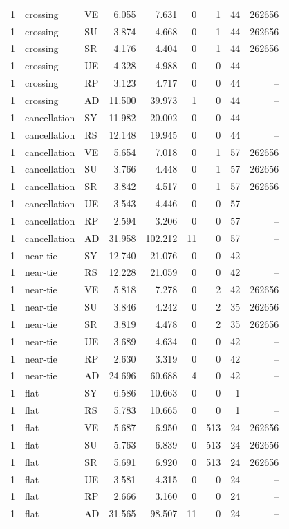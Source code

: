 \begin{longtable}{rllrrrrrr}
1 & crossing & VE & 6.055 & 7.631 & 0 & 1 & 44 & 262656 \\
1 & crossing & SU & 3.874 & 4.668 & 0 & 1 & 44 & 262656 \\
1 & crossing & SR & 4.176 & 4.404 & 0 & 1 & 44 & 262656 \\
1 & crossing & UE & 4.328 & 4.988 & 0 & 0 & 44 & -- \\
1 & crossing & RP & 3.123 & 4.717 & 0 & 0 & 44 & -- \\
1 & crossing & AD & 11.500 & 39.973 & 1 & 0 & 44 & -- \\
1 & cancellation & SY & 11.982 & 20.002 & 0 & 0 & 44 & -- \\
1 & cancellation & RS & 12.148 & 19.945 & 0 & 0 & 44 & -- \\
1 & cancellation & VE & 5.654 & 7.018 & 0 & 1 & 57 & 262656 \\
1 & cancellation & SU & 3.766 & 4.448 & 0 & 1 & 57 & 262656 \\
1 & cancellation & SR & 3.842 & 4.517 & 0 & 1 & 57 & 262656 \\
1 & cancellation & UE & 3.543 & 4.446 & 0 & 0 & 57 & -- \\
1 & cancellation & RP & 2.594 & 3.206 & 0 & 0 & 57 & -- \\
1 & cancellation & AD & 31.958 & 102.212 & 11 & 0 & 57 & -- \\
1 & near-tie & SY & 12.740 & 21.076 & 0 & 0 & 42 & -- \\
1 & near-tie & RS & 12.228 & 21.059 & 0 & 0 & 42 & -- \\
1 & near-tie & VE & 5.818 & 7.278 & 0 & 2 & 42 & 262656 \\
1 & near-tie & SU & 3.846 & 4.242 & 0 & 2 & 35 & 262656 \\
1 & near-tie & SR & 3.819 & 4.478 & 0 & 2 & 35 & 262656 \\
1 & near-tie & UE & 3.689 & 4.634 & 0 & 0 & 42 & -- \\
1 & near-tie & RP & 2.630 & 3.319 & 0 & 0 & 42 & -- \\
1 & near-tie & AD & 24.696 & 60.688 & 4 & 0 & 42 & -- \\
1 & flat & SY & 6.586 & 10.663 & 0 & 0 & 1 & -- \\
1 & flat & RS & 5.783 & 10.665 & 0 & 0 & 1 & -- \\
1 & flat & VE & 5.687 & 6.950 & 0 & 513 & 24 & 262656 \\
1 & flat & SU & 5.763 & 6.839 & 0 & 513 & 24 & 262656 \\
1 & flat & SR & 5.691 & 6.920 & 0 & 513 & 24 & 262656 \\
1 & flat & UE & 3.581 & 4.315 & 0 & 0 & 24 & -- \\
1 & flat & RP & 2.666 & 3.160 & 0 & 0 & 24 & -- \\
1 & flat & AD & 31.565 & 98.507 & 11 & 0 & 24 & -- \\
\hline
\end{longtable}
